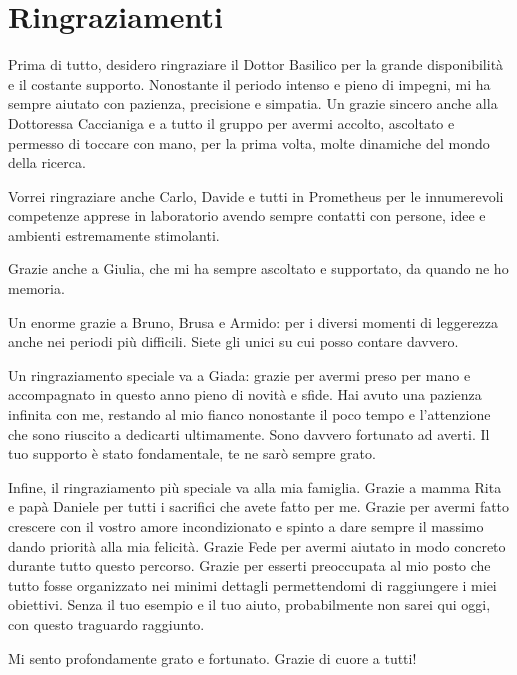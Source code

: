 \chapter*{Ringraziamenti}
Prima di tutto, desidero ringraziare il Dottor Basilico per la grande disponibilità e il costante supporto. Nonostante il periodo intenso e pieno di impegni, mi ha sempre aiutato con pazienza, precisione e simpatia. Un grazie sincero anche alla Dottoressa Caccianiga e a tutto il gruppo per avermi accolto, ascoltato e permesso di toccare con mano, per la prima volta, molte dinamiche del mondo della ricerca. 

Vorrei ringraziare anche Carlo, Davide e tutti in Prometheus per le innumerevoli competenze apprese in laboratorio avendo sempre contatti con persone, idee e ambienti estremamente stimolanti. 

Grazie anche a Giulia, che mi ha sempre ascoltato e supportato, da quando ne ho memoria.

Un enorme grazie a Bruno, Brusa e Armido: per i diversi momenti di leggerezza anche nei periodi più difficili. Siete gli unici su cui posso contare davvero.

Un ringraziamento speciale va a Giada: grazie per avermi preso per mano e accompagnato in questo anno pieno di novità e sfide. Hai avuto una pazienza infinita con me, restando al mio fianco nonostante il poco tempo e l’attenzione che sono riuscito a dedicarti ultimamente. Sono davvero fortunato ad averti. Il tuo supporto è stato fondamentale, te ne sarò sempre grato.

Infine, il ringraziamento più speciale va alla mia famiglia. Grazie a mamma Rita e papà Daniele per tutti i sacrifici che avete fatto per me. Grazie per avermi fatto crescere con il vostro amore incondizionato e spinto a dare sempre il massimo dando priorità alla mia felicità. Grazie Fede per avermi aiutato in modo concreto durante tutto questo percorso. Grazie per esserti preoccupata al mio posto che tutto fosse organizzato nei minimi dettagli permettendomi di raggiungere i miei obiettivi. Senza il tuo esempio e il tuo aiuto, probabilmente non sarei qui oggi, con questo traguardo raggiunto.

Mi sento profondamente grato e fortunato. Grazie di cuore a tutti!
